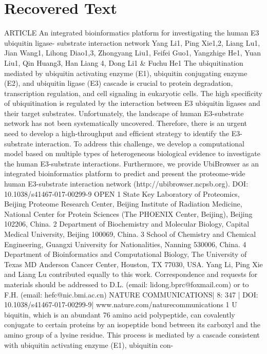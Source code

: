 \section{Recovered Text}
ARTICLE
An integrated bioinformatics platform for
investigating the human E3 ubiquitin ligase-
substrate interaction network
Yang Li1, Ping Xie1,2, Liang Lu1, Jian Wang1, Lihong Diao1,3, Zhongyang Liu1, Feifei Guo1, Yangzhige He1, Yuan Liu1,
Qin Huang3, Han Liang
4, Dong Li1 \& Fuchu He1
The ubiquitination mediated by ubiquitin activating enzyme (E1), ubiquitin conjugating
enzyme (E2), and ubiquitin ligase (E3) cascade is crucial to protein degradation, transcription
regulation, and cell signaling in eukaryotic cells. The high speciﬁcity of ubiquitination is
regulated by the interaction between E3 ubiquitin ligases and their target substrates.
Unfortunately, the landscape of human E3-substrate network has not been systematically
uncovered. Therefore, there is an urgent need to develop a high-throughput and efﬁcient
strategy to identify the E3-substrate interaction. To address this challenge, we develop a
computational model based on multiple types of heterogeneous biological evidence to
investigate the human E3-substrate interactions. Furthermore, we provide UbiBrowser as an
integrated bioinformatics platform to predict and present the proteome-wide human
E3-substrate interaction network (http://ubibrowser.ncpsb.org).
DOI: 10.1038/s41467-017-00299-9
OPEN
1 State Key Laboratory of Proteomics, Beijing Proteome Research Center, Beijing Institute of Radiation Medicine, National Center for Protein Sciences (The
PHOENIX Center, Beijing), Beijing 102206, China. 2 Department of Biochemistry and Molecular Biology, Capital Medical University, Beijing 100069, China.
3 School of Chemistry and Chemical Engineering, Guangxi University for Nationalities, Nanning 530006, China. 4 Department of Bioinformatics and
Computational Biology, The University of Texas MD Anderson Cancer Center, Houston, TX 77030, USA. Yang Li, Ping Xie and Liang Lu contributed equally
to this work. Correspondence and requests for materials should be addressed to D.L. (email: lidong.bprc@foxmail.com) or to F.H. (email: hefc@nic.bmi.ac.cn)
NATURE COMMUNICATIONS| 8:  347
| DOI: 10.1038/s41467-017-00299-9| www.nature.com/naturecommunications
1
U
biquitin, which is an abundant 76 amino acid polypeptide,
can covalently conjugate to certain proteins by an
isopeptide bond between its carboxyl and the amino
group of a lysine residue. This process is mediated by a cascade
consistent with ubiquitin activating enzyme (E1), ubiquitin con-
